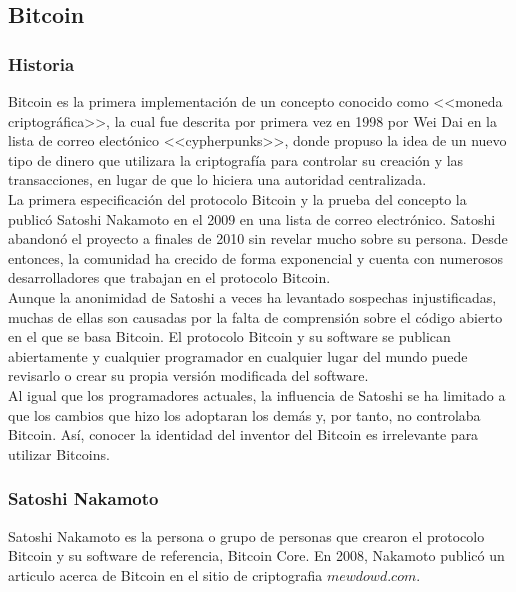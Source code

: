\documentclass[12pt,letterpaper]{article}
\begin{document}
	\subsection*{Bitcoin}
        \subsubsection*{Historia}
        
Bitcoin es la primera implementaci\'on de un concepto conocido como <<moneda criptogr\'afica>>, la cual fue descrita por primera vez en 1998 por Wei Dai en la lista de correo elect\'onico <<cypherpunks>>, donde propuso la idea de un nuevo tipo de dinero que utilizara la criptograf\'ia para controlar su creaci\'on y las transacciones, en lugar de que lo hiciera una autoridad centralizada.
\\

 La primera especificaci\'on del protocolo Bitcoin y la prueba del concepto la public\'o Satoshi Nakamoto en el 2009 en una lista de correo electr\'onico. Satoshi abandon\'o el proyecto a finales de 2010 sin revelar mucho sobre su persona. Desde entonces, la comunidad ha crecido de forma exponencial y cuenta con numerosos desarrolladores que trabajan en el protocolo Bitcoin.
\\

Aunque la anonimidad de Satoshi a veces ha levantado sospechas injustificadas, muchas de ellas son causadas por la falta de comprensi\'on sobre el c\'odigo abierto en el que se basa Bitcoin. El protocolo Bitcoin y su software se publican abiertamente y cualquier programador en cualquier lugar del mundo puede revisarlo o crear su propia versi\'on modificada del software. 
\\

Al igual que los programadores actuales, la influencia de Satoshi se ha limitado a que los cambios que hizo los adoptaran los dem\'as y, por tanto, no controlaba Bitcoin. As\'i, conocer la identidad del inventor del Bitcoin es irrelevante para utilizar Bitcoins.
\\
            
                \subsubsection*{Satoshi Nakamoto}
Satoshi Nakamoto es la persona o grupo de personas que crearon el protocolo Bitcoin y su software de referencia, Bitcoin Core. 
En 2008, Nakamoto public\'o un articulo acerca de Bitcoin en el sitio de criptografia $mewdowd.com$. 
\\
\end{document}
